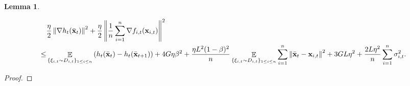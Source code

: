 \documentclass{article}
\newtheorem{Lemma}{\bf{Lemma}}
\begin{document}
\begin{Lemma}
\label{lemma_gradient_norm_bound}

\begin{align}
\nonumber
& \frac{\eta}{2}\left\lVert\nabla h_t(\bar{{\bf x}}_t)\right\rVert^2 + \frac{\eta}{2}\left\lVert\frac{1}{n}\sum_{i=1}^n \nabla f_{i,t}({\bf x}_{i,t})\right\rVert^2 \\ \nonumber 
\le & \mathop{\mathbb{E}}_{ \{\xi_{i,t} \sim D_{i,t}\}_{1\le i \le n} } \left( h_t(\bar{{\bf x}}_t) - h_t(\bar{{\bf x}}_{t+1}) \right) + 4G\eta\beta^2 +  \frac{\eta L^2(1-\beta)^2}{n}\mathop{\mathbb{E}}_{ \{\xi_{i,t} \sim D_{i,t}\}_{1\le i \le n} }\sum_{i=1}^n\left\lVert\bar{{\bf x}}_t - {\bf x}_{i,t} \right\rVert^2 + 3GL\eta^2  + \frac{2L\eta^2}{n}\sum_{i=1}^n \sigma_{i,t}^2.
\end{align}
\end{Lemma}
\begin{proof}


\end{proof}
\end{document}
